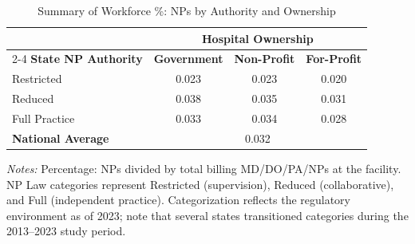 \begin{table}[htbp]
    \centering
    \caption{Summary of Workforce \%: NPs by Authority and Ownership}
    \label{tab:pct_np}
    \vspace{0.2cm}
    \begin{tabular}{lccc}
        \toprule
        & \multicolumn{3}{c}{\textbf{Hospital Ownership}} \\
        \cmidrule(lr){2-4}
        \textbf{State NP Authority} & \textbf{Government} & \textbf{Non-Profit} & \textbf{For-Profit} \\
        \midrule
        Restricted & 0.023 & 0.023 & 0.020 \\
        Reduced & 0.038 & 0.035 & 0.031 \\
        Full Practice & 0.033 & 0.034 & 0.028 \\
        \midrule
        \textbf{National Average} & \multicolumn{3}{c}{0.032} \\
        \bottomrule
    \end{tabular}
    \vspace{0.1cm}
    \begin{minipage}{0.85\textwidth}
        \footnotesize \textit{Notes:} Percentage: NPs divided by total billing MD/DO/PA/NPs at the facility. NP Law categories represent Restricted (supervision), Reduced (collaborative), and Full (independent practice). Categorization reflects the regulatory environment as of 2023; note that several states transitioned categories during the 2013--2023 study period.
    \end{minipage}
\end{table}